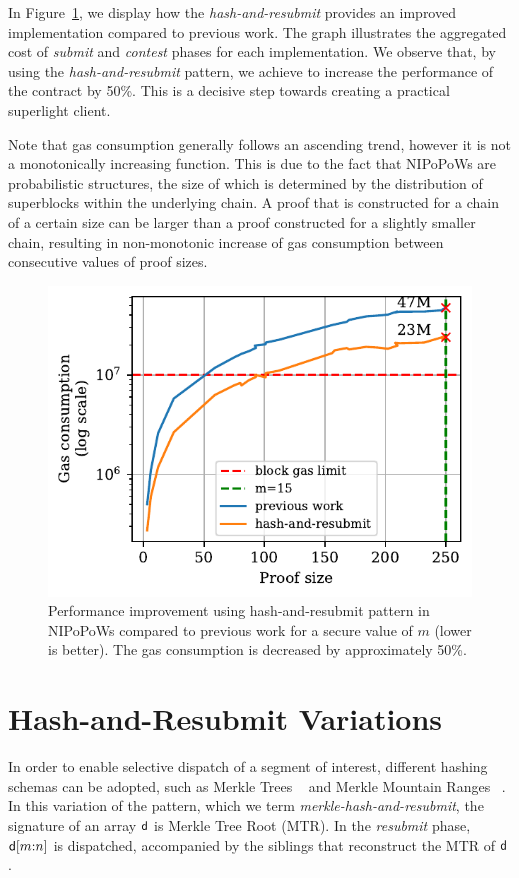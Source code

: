 In Figure~\ref{fig:har-nipopow}, we display how the \emph{hash-and-resubmit}
provides an improved implementation compared to previous work. The graph
illustrates the aggregated cost of \emph{submit} and \emph{contest} phases for
each implementation. We observe that, by using the \emph{hash-and-resubmit}
pattern, we achieve to increase the performance of the contract by 50\%. This
is a decisive step towards creating a practical superlight client.

Note that gas consumption generally follows an ascending trend, however it
is not a monotonically increasing function. This is due to the fact that
NIPoPoWs are probabilistic structures, the size of which is determined by the
distribution of superblocks within the underlying chain. A proof that is
constructed for a chain of a certain size can be larger than a proof
constructed for a slightly smaller chain, resulting in non-monotonic increase
of gas consumption between consecutive values of proof sizes.



\begin{figure}[H]
    \begin{center}
        \includegraphics[width=0.6\columnwidth]{figures/har-nipopows.pdf}
    \end{center}
    \caption{Performance improvement using hash-and-resubmit pattern in
        NIPoPoWs compared to previous work for a secure value of $m$ (lower is
        better). The gas consumption is decreased by approximately 50\%.}
    \label{fig:har-nipopow}
\end{figure}

\section{Hash-and-Resubmit Variations}
In order to enable selective dispatch of a segment of interest, different
hashing schemas can be adopted, such as Merkle Trees ~\cite{merkle} and Merkle Mountain
Ranges ~\cite{mmr-1, mmr-2}. In this variation of the pattern, which we term
\emph{merkle-hash-and-resubmit}, the signature of an array $\mathsf{d}$ is
Merkle Tree Root (MTR). In the \emph{resubmit} phase, $\mathsf{d}[m{:}n]$ is
dispatched, accompanied by the siblings that reconstruct the MTR of
$\mathsf{d}$.

